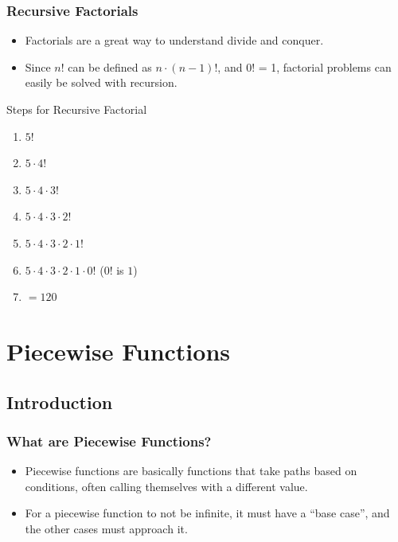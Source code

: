 \documentclass[fleqn, t]{beamer}
\begin{document}
\begin{frame}
  \frametitle{Recursive Factorials}
  \begin{itemize}[<+->]
  \item Factorials are a great way to understand divide and conquer.  
  \item Since $n!$ can be defined as $n \cdot (n-1)!$, and $0!$ = 1, factorial
    problems can easily be solved with recursion. 
  \end{itemize}
  \begin{block}{Steps for Recursive Factorial}
    \begin{enumerate}[<+->]
    \item $5!$
    \item $5 \cdot 4!$
    \item $5 \cdot 4 \cdot 3!$ 
    \item $5 \cdot 4 \cdot 3 \cdot 2!$
    \item $5 \cdot 4 \cdot 3 \cdot 2 \cdot 1!$
    \item $5 \cdot 4 \cdot 3 \cdot 2 \cdot 1 \cdot 0!$ ($0!$ is $1$)
    \item $= 120$
    \end{enumerate}
  \end{block}
\end{frame}

\section{Piecewise Functions}
\subsection{Introduction}
\begin{frame}
  \frametitle{What are Piecewise Functions?}
  \begin{itemize}[<+->]
  \item Piecewise functions are basically functions that take paths based on
    conditions, often calling themselves with a different value. 
  \item For a piecewise function to not be infinite, it must have a ``base case'',
    and the other cases must approach it.
  \end{itemize}
\end{frame}
\end{document}
